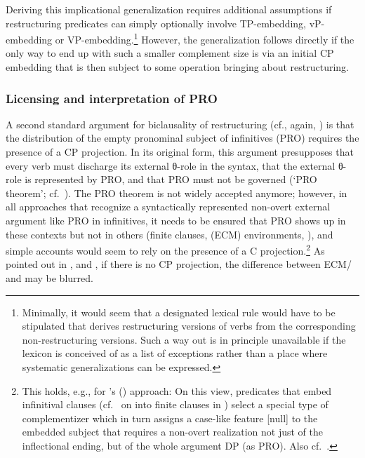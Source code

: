 \documentclass[output=paper]{langsci/langscibook}
\newcommand{\scite}[2]{\citeauthor{#2}#1 (\citeyear{#2})}
\begin{document}
Deriving this implicational generalization requires additional assumptions if
restructuring predicates can simply optionally involve TP-embedding,
vP-em\-bed\-ding or VP-embedding.\footnote{Minimally, it would seem that a
    designated lexical rule would have to be stipulated that derives
    restructuring versions of verbs from the corresponding non-restructuring
    versions. Such a way out is in principle unavailable if the lexicon is
    conceived of as a list of exceptions rather than a place where systematic
generalizations can be expressed.} However, the generalization follows directly
if the only way to end up with such a smaller complement size is via an initial
CP embedding that is then subject to some operation bringing about
restructuring.

\subsubsection{\label{b2}Licensing and interpretation of PRO}

A second standard argument for biclausality of restructuring (cf., again,
\citealt{Stechow&Sternefeld:88}) is that the distribution of the empty
pronominal subject of  infinitives (PRO) requires the presence of a CP
projection.  In its original form, this argument presupposes that every verb
must discharge its external θ-role in the syntax, that the external
θ-role is represented by PRO, and that PRO must not be governed (`PRO
theorem'; cf.\ \citealt{Chomsky:81}). The PRO theorem is not widely accepted
anymore; however, in all approaches that recognize a syntactically represented
non-overt external argument like PRO in  infinitives, it needs to be
ensured that PRO shows up in these contexts but not in others (finite clauses,
 (\gls{ECM}) environments, ), and simple accounts
would seem to rely on the presence of a C projection.\footnote{\label{pro3}This
    holds, e.g., for \scite{'s}{Adger:2003a} approach: On this view, 
    predicates that embed infinitival clauses (cf.\ \citealt{Stiebels:10:inh}
    on  into finite clauses in ) select a special type of
    complementizer which in turn assigns a case-like feature [null] to the
    embedded subject that requires a non-overt realization not just of the
inflectional ending, but of the whole argument DP (as PRO). Also cf.\
\cite{Chomsky&Lasnik:93,Roberts:97:res}.} As pointed out in
\cite{Stechow&Sternefeld:88}, and \cite{Sternefeld:90:pro}, if there is no CP
projection, the difference between \is{exceptional case marking}ECM/ and  may be blurred.
\end{document}
